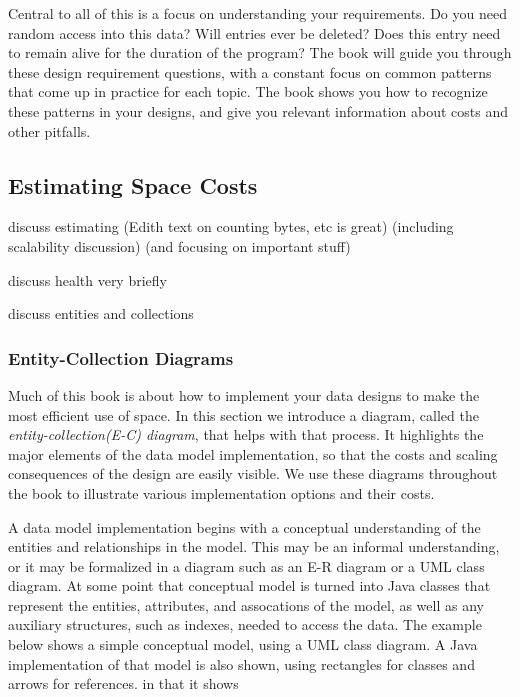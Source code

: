 Central to all of this is a focus on understanding your requirements. Do you
need random access into this data? Will entries ever be deleted? Does this entry
need to remain alive for the duration of the program? The book will guide you
through these design requirement questions, with a constant focus on common
patterns that come up in practice for each topic. The book shows you how to
recognize these patterns in your designs, and give you relevant information
about costs and other pitfalls.


\subsection{Estimating Space Costs}

discuss estimating (Edith text on counting bytes, etc is great) (including
scalability discussion) (and focusing on important stuff)

discuss health very briefly

discuss entities and collections

\subsubsection{Entity-Collection Diagrams}

Much of this book is about how to implement your data designs to make the most
efficient use of space. In this section we introduce a diagram, called the
\emph{entity-collection(E-C) diagram}, that helps with that process. It
highlights the major elements of the data model implementation, so that the
costs and scaling consequences of the design are easily visible. We use these
diagrams throughout the book to illustrate various implementation options and
their costs.

A data model implementation begins with a conceptual understanding of the
entities and relationships in the model.  This may be an informal understanding,
or it may be formalized in a diagram such as an E-R diagram or a UML class
diagram.  At some point that conceptual model is turned into Java classes that
represent the entities, attributes, and assocations of the model, as well as any
auxiliary structures, such as indexes, needed to access the data.  The example
below shows a simple conceptual model, using a UML class diagram.  A Java
implementation of that model is also shown, using rectangles for classes and
arrows for references.  %
in that it shows


